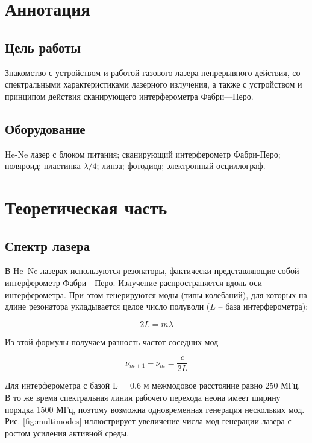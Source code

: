    
    
    \tableofcontents
    \newpage
    
\section{Аннотация}

\subsection{Цель работы} 
Знакомство с устройством и работой газового лазера непрерывного действия, со спектральными характеристиками лазерного излучения, а также с устройством и принципом действия сканирующего интерферометра Фабри—Перо.

\subsection{Оборудование}
He-Ne лазер с блоком питания; сканирующий интерферометр Фабри-Перо; поляроид; пластинка $\lambda/4$; линза; фотодиод; электронный осциллограф.


\section{Теоретическая часть}
\subsection{Спектр лазера}
В He–Ne-лазерах используются резонаторы, фактически представляющие собой интерферометр Фабри—Перо. Излучение распространяется вдоль оси интерферометра. При этом генерируются моды (типы колебаний), для которых на длине резонатора укладывается целое число полуволн
($L$ -- база интерферометра):

\begin{equation}
    2L=m\lambda
    \label{eq:mode_distance_lambda}
\end{equation}

Из этой формулы получаем разность частот соседних мод

\begin{equation}
    \nu_{m+1} - \nu_{m} = \frac{c}{2L}
    \label{eq:mode_distance_freq}
\end{equation}

Для интерферометра с базой L = 0,6 м межмодовое расстояние равно 250 МГц. В то же время спектральная линия рабочего перехода неона имеет ширину порядка 1500 МГц, поэтому возможна одновременная генерация нескольких мод. Рис. \ref{fig:multimodes} иллюстрирует увеличение числа мод генерации лазера с ростом усиления активной среды.

